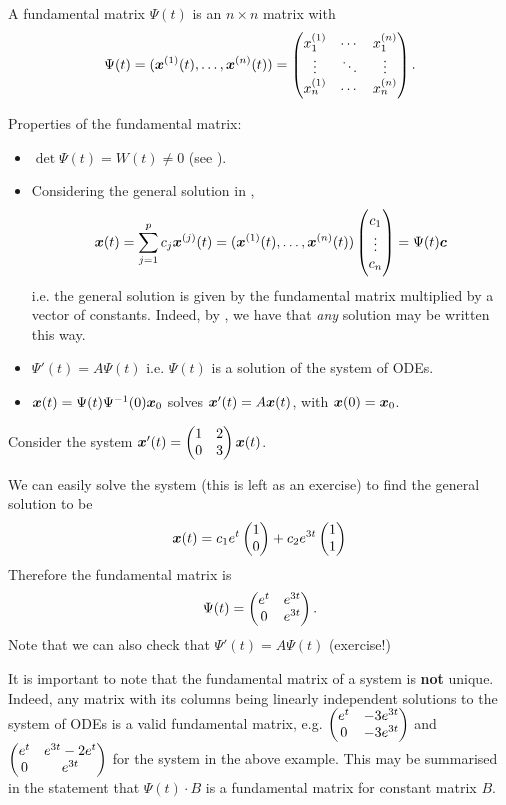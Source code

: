 \begin{definition}
	A fundamental matrix $\Psi(t)$ is an $n \times n$ matrix with
	\[
	\Psi(t) = (\bm{x}^{(1)}(t), \ldots, \bm{x}^{(n)}(t)) = \begin{pmatrix}x_1^{(1)} & \cdots & x_1^{(n)} \\ \vdots & \ddots & \vdots \\ x_n^{(1)} & \cdots & x_n^{(n)} \\
	\end{pmatrix}.
	\]
\end{definition}

Properties of the fundamental matrix:
\begin{itemize}
	\item $\det \Psi(t) = W(t) \neq 0$ (see ).
	\item{Considering the general solution in ,
		\begin{align*}
			\bm{x}(t) = \sum_{j=1}^p c_j \bm{x}^{(j)}(t) = (\bm{x}^{(1)}(t), \ldots, \bm{x}^{(n)}(t)) \begin{pmatrix}c_1 \\ \vdots \\ c_n\end{pmatrix} = \Psi(t) \bm{c}
		\end{align*}
		i.e. the general solution is given by the fundamental matrix multiplied by a vector of constants. Indeed, by , we have that \emph{any} solution may be written this way.}
	\item $\Psi'(t) = A \Psi(t)$ i.e. $\Psi(t)$ is a solution of the system of ODEs.
	\item $\bm{x}(t) = \Psi(t) \Psi^{-1}(0) \bm{x}_0$ solves $\bm{x}'(t) = A\bm{x}(t)$, with $\bm{x}(0) = \bm{x}_0$.
\end{itemize}

\begin{eg}\label{eg:fundamentalmatrix}
	Consider the system $\bm{x}'(t) = \begin{pmatrix}1 & 2 \\ 0 & 3\end{pmatrix} \bm{x}(t)$.
	
	We can easily solve the system (this is left as an exercise) to find the general solution to be
	\[
	\bm{x}(t) = c_1 e^t \begin{pmatrix}1 \\ 0\end{pmatrix} + c_2 e^{3t} \begin{pmatrix}1 \\ 1\end{pmatrix}
	\]
	Therefore the fundamental matrix is
	\[
	\Psi(t) = \begin{pmatrix}e^t & e^{3t} \\ 0 & e^{3t}\end{pmatrix}.
	\]
	Note that we can also check that $\Psi'(t) = A\Psi(t)$ (exercise!)
\end{eg}

It is important to note that the fundamental matrix of a system is \textbf{not} unique. Indeed, any matrix with its columns being linearly independent solutions to the system of ODEs is a valid fundamental matrix, e.g. $\begin{pmatrix}e^t & -3e^{3t} \\ 0 & -3e^{3t}\end{pmatrix}$ and $\begin{pmatrix}e^t & e^{3t}-2e^t \\ 0 & e^{3t}\end{pmatrix}$ for the system in the above example. This may be summarised in the statement that $\Psi(t) \cdot B$ is a fundamental matrix for constant matrix $B$.

